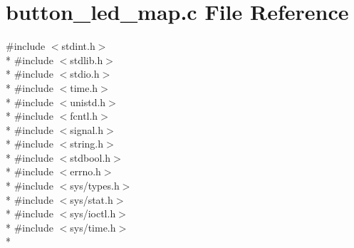 \section{button\-\_\-led\-\_\-map.\-c File Reference}
\label{button__led__map_8c}
{\ttfamily \#include $<$stdint.\-h$>$}\\*
{\ttfamily \#include $<$stdlib.\-h$>$}\\*
{\ttfamily \#include $<$stdio.\-h$>$}\\*
{\ttfamily \#include $<$time.\-h$>$}\\*
{\ttfamily \#include $<$unistd.\-h$>$}\\*
{\ttfamily \#include $<$fcntl.\-h$>$}\\*
{\ttfamily \#include $<$signal.\-h$>$}\\*
{\ttfamily \#include $<$string.\-h$>$}\\*
{\ttfamily \#include $<$stdbool.\-h$>$}\\*
{\ttfamily \#include $<$errno.\-h$>$}\\*
{\ttfamily \#include $<$sys/types.\-h$>$}\\*
{\ttfamily \#include $<$sys/stat.\-h$>$}\\*
{\ttfamily \#include $<$sys/ioctl.\-h$>$}\\*
{\ttfamily \#include $<$sys/time.\-h$>$}\\*
